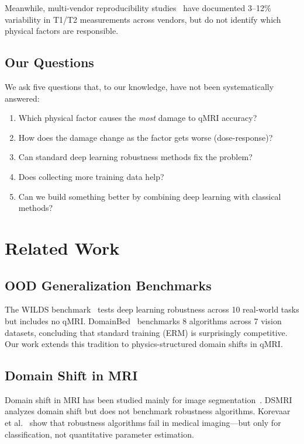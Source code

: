 \documentclass[11pt,a4paper]{article}
\begin{document}
Meanwhile, multi-vendor reproducibility
studies~\cite{captur2020t1,kim2020multivendor} have documented 3--12\%
variability in T1/T2 measurements across vendors, but do not identify
which physical factors are responsible.

\subsection{Our Questions}

We ask five questions that, to our knowledge, have not been
systematically answered:
\begin{enumerate}
  \item Which physical factor causes the \emph{most} damage to qMRI
    accuracy?
  \item How does the damage change as the factor gets worse
    (dose-response)?
  \item Can standard deep learning robustness methods fix the problem?
  \item Does collecting more training data help?
  \item Can we build something better by combining deep learning with classical
    methods?
\end{enumerate}


\section{Related Work}
\label{sec:related}

\subsection{OOD Generalization Benchmarks}
The WILDS benchmark~\cite{koh2021wilds} tests deep learning robustness across 10
real-world tasks but includes no qMRI. DomainBed~\cite{gulrajani2021search}
benchmarks 8 algorithms across 7 vision datasets, concluding that
standard training (ERM) is surprisingly competitive. Our work extends
this tradition to physics-structured domain shifts in qMRI.

\subsection{Domain Shift in MRI}
Domain shift in MRI has been studied mainly for image
segmentation~\cite{full2020studying,panfilov2019improving}.
DSMRI~\cite{kushol2023dsmri} analyzes domain shift but does not
benchmark robustness algorithms. Korevaar et al.~\cite{korevaar2023failure}
show that robustness algorithms fail in medical imaging---but only for
classification, not quantitative parameter estimation.
\end{document}
